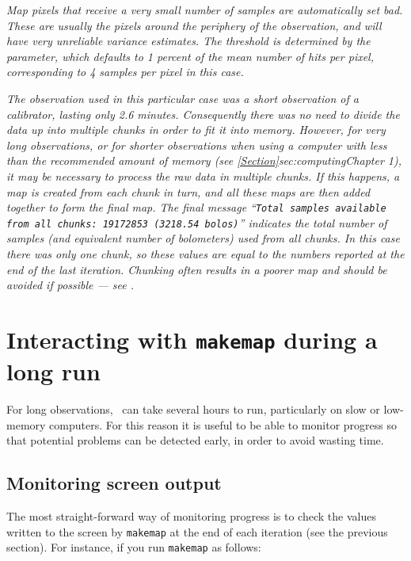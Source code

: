 \begin{terminalv}
\emph{Map pixels that receive a very small number of samples are automatically
set bad. These are usually the pixels around the periphery of the
observation, and will have very unreliable variance estimates. The
threshold is determined by the  parameter,
which defaults to 1 percent of the mean number of hits per pixel,
corresponding to 4 samples per pixel in this case.}

\emph{The observation used in this particular case was a short
observation of a calibrator, lasting only 2.6 minutes. Consequently there
was no need to divide the data up into multiple chunks in order to fit it
into memory.  However, for very long observations, or for shorter
observations when using a computer with less than the recommended amount
of memory (see \cref{Section}{sec:computing}{Chapter 1}), it may be
necessary to process the raw data in multiple chunks. If this happens, a
map is created from each chunk in turn, and all these maps are then added
together to form the final map.  The final message ``\texttt{Total
samples available from all chunks: 19172853 (3218.54 bolos)}'' indicates
the total number of samples (and equivalent number of bolometers) used
from all chunks. In this case there was only one chunk, so these values
are equal to the numbers reported at the end of the last iteration.
Chunking often results in a poorer map and should be avoided
if possible --- see 
{}.}

\section{Interacting with \texttt{makemap} during a long run}
For long observations, \makemap\ can take several hours to run,
particularly on slow or low-memory computers. For this reason it is
useful to be able to monitor progress so that potential problems can be
detected early, in order to avoid wasting time.

\subsection{Monitoring screen output}
The most straight-forward way of monitoring progress is to check the
values written to the screen by \texttt{makemap} at the end of each iteration (see
the previous section). For instance, if you run \texttt{makemap} as follows:

\begin{terminalv}
\end{terminalv}


\end{terminalv}
